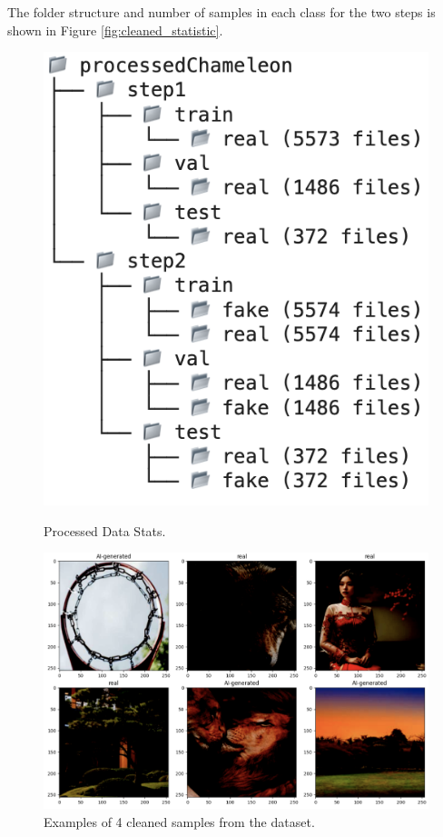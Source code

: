 \documentclass{article} %
\begin{document}
The folder structure and number of samples in each class for the two steps is shown in Figure \ref{fig:cleaned_statistic}.
\begin{figure}[h]
    \centering
    \begin{minipage}[t]{0.3\textwidth}
        \centering
        \includegraphics[width=\textwidth]{figs/cleaned_statistic.png}
        \caption{Processed Data Stats.}
        \label{fig:cleaned_statistic}
    \end{minipage}
    \hfill
    \begin{minipage}[t]{0.6\textwidth}
        \centering
        \includegraphics[width=\textwidth]{figs/data_examples_2by3.png}
        \caption{Examples of 4 cleaned samples from the dataset.}
        \label{fig:cleaned_sample}
    \end{minipage}
\end{figure}
\end{document}
